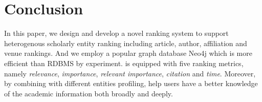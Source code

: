 \section{Conclusion}
\label{sec-conc}

In this paper, we design and develop a novel ranking system \oursystem to support heterogenous scholarly entity ranking including article, author, affiliation and venue rankings. And we employ a popular graph database Neo4j which is more efficient than RDBMS by experiment. \oursystem is equipped with five ranking metrics, namely {\em relevance}, {\em importance}, {\em relevant importance}, {\em citation} and {\em time}.
Moreover, by combining with different entities profiling, \oursystem help users have a better knowledge of the academic information both broadly and deeply.






